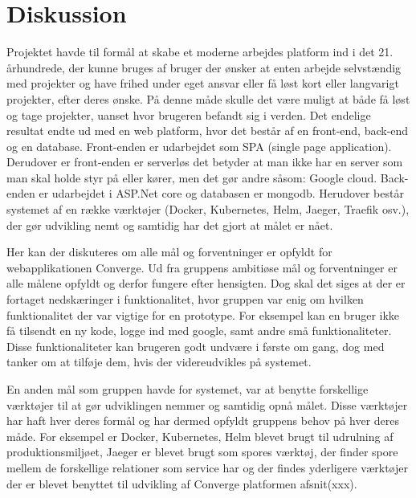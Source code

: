 \chapter{Diskussion}
\label{cha:discussion}

Projektet havde til formål at skabe et moderne arbejdes platform ind i det 21. århundrede, der kunne bruges af bruger der ønsker at enten arbejde selvstændig med projekter og have frihed under eget ansvar eller få løst kort eller langvarigt projekter, efter deres ønske. På denne måde skulle det være muligt at både få løst og tage projekter, uanset hvor brugeren befandt sig i verden. Det endelige resultat endte ud med en web platform, hvor det består af en front-end, back-end og en database.  Front-enden er udarbejdet som SPA (single page application). Derudover er front-enden er serverløs det betyder at man ikke har en server som man skal holde styr på eller kører, men det gør andre såsom: Google cloud. Back-enden er udarbejdet i ASP.Net core og databasen er mongodb. Herudover består systemet af en række værktøjer (Docker, Kubernetes, Helm, Jaeger, Traefik osv.), der gør udvikling nemt og samtidig har det gjort at målet er nået. 

Her kan der diskuteres om alle mål og forventninger er opfyldt for webapplikationen Converge. Ud fra gruppens ambitiøse mål og forventninger er alle målene opfyldt og derfor fungere efter hensigten. Dog skal det siges at der er fortaget nedskæringer i funktionalitet, hvor gruppen var enig om hvilken funktionalitet der var vigtige for en prototype. For eksempel kan en bruger ikke få tilsendt en ny kode, logge ind med google, samt andre små funktionaliteter. Disse funktionaliteter kan brugeren godt undvære i første om gang, dog med tanker om at tilføje dem, hvis der videreudvikles på systemet. 

En anden mål som gruppen havde for systemet, var at benytte forskellige værktøjer til at gør udviklingen nemmer og samtidig opnå målet. Disse værktøjer har haft hver deres formål og har dermed opfyldt gruppens behov på hver deres måde. For eksempel er Docker, Kubernetes, Helm blevet brugt til udrulning af produktionsmiljøet, Jaeger er blevet brugt som spores værktøj, der finder spore mellem de forskellige relationer som service har og der findes yderligere værktøjer der er blevet benyttet til udvikling af Converge platformen afsnit(xxx). 

